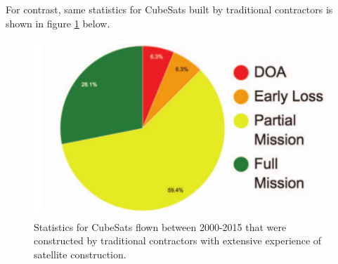 \documentclass[english,12pt,a4paper,pdftex,elec,utf8]{aaltothesis}
\begin{document}
For contrast, same statistics for CubeSats built by traditional contractors is shown in figure \ref{tradiotionalflown2015pic} below. \par
\begin{figure}[h!]
\includegraphics[scale=0.5]{traditionalflown2015}
\caption{Statistics for CubeSats flown between 2000-2015 that were constructed by traditional contractors with extensive experience of satellite construction. \cite{Swart2016}}
\label{tradiotionalflown2015pic}
\end{figure} 
\end{document}
